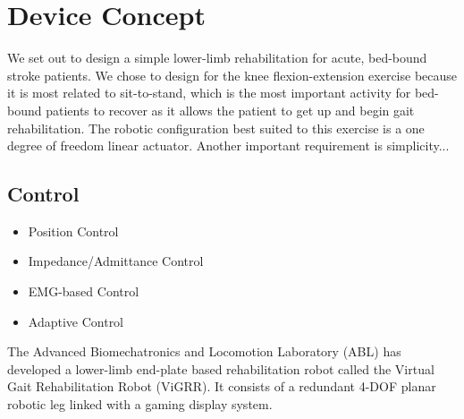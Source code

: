 \documentclass[12pt]{report}
\begin{document}
\section{Device Concept} 
%
We set out to design a simple lower-limb rehabilitation for acute, bed-bound stroke patients. We chose to design for the knee flexion-extension exercise because it is most related to sit-to-stand, which is the most important activity for bed-bound patients to recover as it allows the patient to get up and begin gait rehabilitation. The robotic configuration best suited to this exercise is a one degree of freedom linear actuator. 
	Another important requirement is simplicity...



	\subsection{Control}
	
	\begin{itemize}
		\item Position Control
		\item Impedance/Admittance Control
		\item EMG-based Control
		\item Adaptive Control 
	\end{itemize}
	\cite{Meng2015}
	
	The Advanced Biomechatronics and Locomotion Laboratory (ABL) has developed a lower-limb end-plate based rehabilitation robot called the Virtual Gait Rehabilitation Robot (ViGRR). It consists of a redundant 4-DOF planar robotic leg linked with a gaming display system. \cite{Chisholm2010}
	
\end{document}

